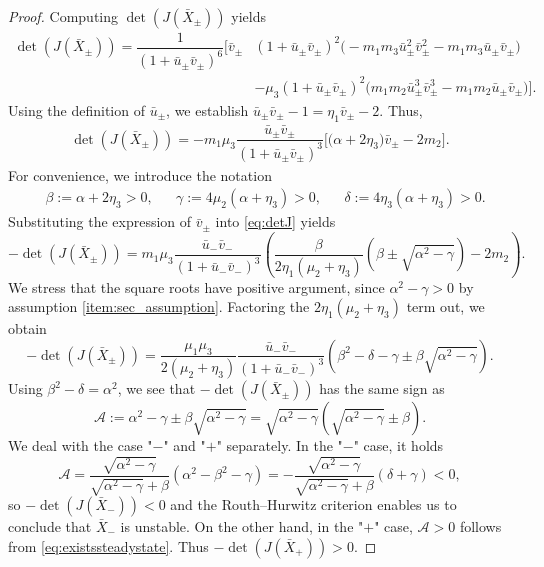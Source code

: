 \documentclass[12pt, a4paper]{amsart}
\numberwithin{equation}{section}
\newcommand{\CSS}{\bar{X}}
\def\mf{\mu_1}
\def\ml{\mu_2}
\def\me{\mu_3}
\def\lp{\left(}
\def\rp{\right)}
\begin{document}
\begin{proof}
Computing $\det(J(\CSS_\pm))$ yields
\begin{align*}
\det(J(\CSS_\pm)) = \dfrac{1}{(1 + \bar u_\pm \bar v_\pm)^6} \biggl[ \bar v_\pm & (1 + \bar u_\pm \bar v_\pm)^2 \biggl(-m_1m_3 \bar u_\pm^2 \bar v_\pm^2 - m_1 m_3 \bar u_\pm \bar v_\pm \biggr) \\ & - \mu_3 (1 + \bar u_\pm \bar v_\pm)^2 \biggl( m_1 m_2 \bar u_\pm^3 \bar v_\pm^3 - m_1 m_2 \bar u_\pm \bar v_\pm \biggr) \biggr].
\end{align*}
Using the definition of $\bar u_\pm$, we establish $\bar u_\pm \bar v_\pm - 1 = \eta_1 \bar v_\pm - 2$. 
Thus,
\begin{align}
\label{eq:detJ}
\det(J(\CSS_\pm)) = -m_1 \mu_3 \dfrac{\bar u_\pm \bar v_\pm}{(1 + \bar u_\pm \bar v_\pm)^3} \biggl[\bigl(\alpha + 2 \eta_3 \bigr) \bar v_\pm  - 2 m_2\biggr].
\end{align}
For convenience, we introduce the notation
\begin{align*}
&\beta := \alpha + 2\eta_3 > 0, & &\gamma := 4\mu_2 (\alpha + \eta_3) > 0, & &\delta := 4 \eta_3 (\alpha + \eta_3) > 0.
\end{align*} 
Substituting the expression of $\bar v_\pm$ 
into \eqref{eq:detJ} yields
$$-\det(J(\CSS_\pm)) = m_1 \me \dfrac{\bar u_- \bar v_-}{(1+\bar u_- \bar v_-)^3} \lp \dfrac{\beta}{2\eta_1 (\ml + \eta_3)} \lp \beta \pm \sqrt{\alpha^2 - \gamma} \rp - 2 m_2 \rp.$$
We stress that the square roots have positive argument, since $\alpha^2 - \gamma > 0$ by assumption \ref{item:sec_assumption}.
Factoring the $2\eta_1(\ml + \eta_3)$ term out, we obtain
$$- \det(J(\CSS_\pm)) = \dfrac{\mf \me}{2 (\ml + \eta_3) } \dfrac{\bar u_- \bar v_-}{(1+\bar u_- \bar v_-)^3} \lp \beta^2 - \delta - \gamma \pm \beta \sqrt{\alpha^2 - \gamma} \rp.$$
Using $\beta^2 - \delta = \alpha^2$, we see that $-\det(J(\CSS_\pm))$ has the same sign as
$$\mathcal A := \alpha^2 - \gamma \pm \beta \sqrt{\alpha^2 - \gamma} = \sqrt{\alpha^2 - \gamma} \lp \sqrt{\alpha^2 - \gamma} \pm \beta \rp.$$
We deal with the case "$-$" and "$+$" separately. In the "$-$" case, it holds
$$\mathcal A = \dfrac{\sqrt{\alpha^2 - \gamma}}{\sqrt{\alpha^2-\gamma} + \beta} \lp \alpha^2 - \beta^2 - \gamma \rp = - \dfrac{\sqrt{\alpha^2 - \gamma}}{\sqrt{\alpha^2-\gamma} + \beta} \lp \delta + \gamma \rp < 0,$$
so $-\det(J(\CSS_-)) < 0$ and the Routh--Hurwitz criterion enables us to conclude that $\CSS_-$ is unstable. On the other hand, in the "$+$" case, $\mathcal A > 0$ follows from \eqref{eq:existssteadystate}. Thus $-\det(J(\CSS_+)) > 0$.

\end{proof}
\end{document}
